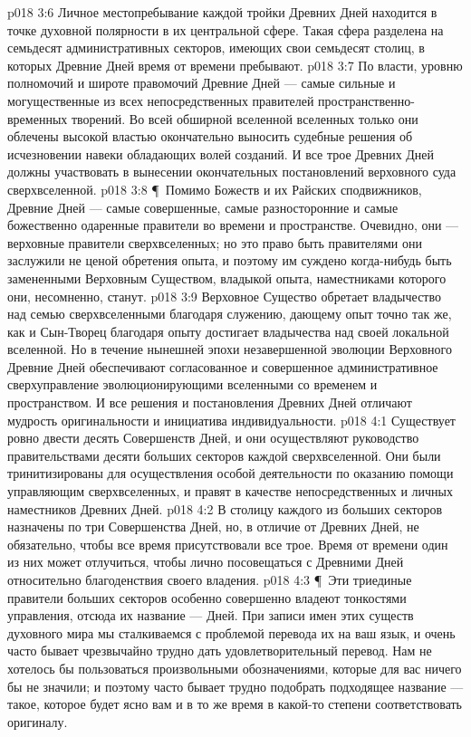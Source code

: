 \vs p018 3:6 Личное местопребывание каждой тройки Древних Дней находится в точке духовной полярности в их центральной сфере. Такая сфера разделена на семьдесят административных секторов, имеющих свои семьдесят столиц, в которых Древние Дней время от времени пребывают.
\vs p018 3:7 По власти, уровню полномочий и широте правомочий Древние Дней --- самые сильные и могущественные из всех непосредственных правителей пространственно\hyp{}временных творений. Во всей обширной вселенной вселенных только они облечены высокой властью окончательно выносить судебные решения об исчезновении навеки обладающих волей созданий. И все трое Древних Дней должны участвовать в вынесении окончательных постановлений верховного суда сверхвселенной.
\vs p018 3:8 \P\ Помимо Божеств и их Райских сподвижников, Древние Дней --- самые совершенные, самые разносторонние и самые божественно одаренные правители во времени и пространстве. Очевидно, они --- верховные правители сверхвселенных; но это право быть правителями они заслужили не ценой обретения опыта, и поэтому им суждено когда\hyp{}нибудь быть замененными Верховным Существом, владыкой опыта, наместниками которого они, несомненно, станут.
\vs p018 3:9 Верховное Существо обретает владычество над семью сверхвселенными благодаря служению, дающему опыт точно так же, как и Сын\hyp{}Творец благодаря опыту достигает владычества над своей локальной вселенной. Но в течение нынешней эпохи незавершенной эволюции Верховного Древние Дней обеспечивают согласованное и совершенное административное сверхуправление эволюционирующими вселенными со временем и пространством. И все решения и постановления Древних Дней отличают мудрость оригинальности и инициатива индивидуальности.
\vs p018 4:1 Существует ровно двести десять Совершенств Дней, и они осуществляют руководство правительствами десяти больших секторов каждой сверхвселенной. Они были тринитизированы для осуществления особой деятельности по оказанию помощи управляющим сверхвселенных, и правят в качестве непосредственных и личных наместников Древних Дней.
\vs p018 4:2 В столицу каждого из больших секторов назначены по три Совершенства Дней, но, в отличие от Древних Дней, не обязательно, чтобы все время присутствовали все трое. Время от времени один из них может отлучиться, чтобы лично посовещаться с Древними Дней относительно благоденствия своего владения.
\vs p018 4:3 \P\ Эти триединые правители больших секторов особенно совершенно владеют тонкостями управления, отсюда их название ---  Дней. При записи имен этих существ духовного мира мы сталкиваемся с проблемой перевода их на ваш язык, и очень часто бывает чрезвычайно трудно дать удовлетворительный перевод. Нам не хотелось бы пользоваться произвольными обозначениями, которые для вас ничего бы не значили; и поэтому часто бывает трудно подобрать подходящее название --- такое, которое будет ясно вам и в то же время в какой\hyp{}то степени соответствовать оригиналу.
